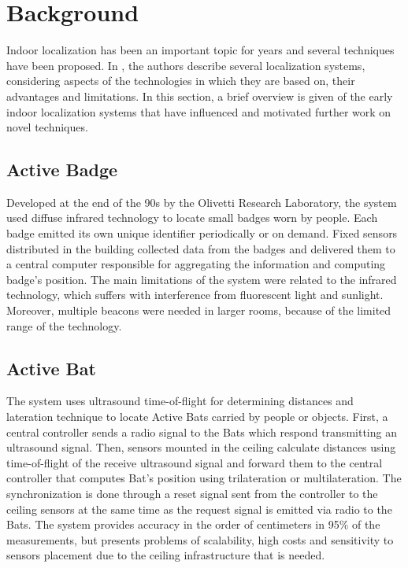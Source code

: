 \section{Background}

Indoor localization has been an important topic for years and several techniques have been proposed. In \cite{locSysUbiComp}, the authors describe several localization systems, considering aspects of the technologies in which they are based on, their advantages and limitations. In this section, a brief overview is given of the early indoor localization systems that have influenced and motivated further work on novel techniques.

\subsection{Active Badge}
Developed at the end of the 90s by the Olivetti Research Laboratory, the system used diffuse infrared technology to locate small badges worn by people. Each badge emitted its own unique identifier periodically or on demand. Fixed sensors distributed in the building collected data from the badges and delivered them to a central computer responsible for aggregating the information and computing badge's position. The main limitations of the system were related to the infrared technology, which suffers with interference from fluorescent light and sunlight. Moreover, multiple beacons were needed in larger rooms, because of the limited range of the technology.

\subsection{Active Bat}
The system uses ultrasound time-of-flight for determining distances and lateration technique to locate Active Bats carried by people or objects. First, a central controller sends a radio signal to the Bats which respond transmitting an ultrasound signal. Then, sensors mounted in the ceiling calculate distances using time-of-flight of the receive ultrasound signal and forward them to the central controller that computes Bat's position using trilateration or multilateration. The synchronization is done through a reset signal sent from the controller to the ceiling sensors at the same time as the request signal is emitted via radio to the Bats. The system provides accuracy in the order of centimeters in 95\% of the measurements, but presents problems of scalability, high costs and sensitivity to sensors placement due to the ceiling infrastructure that is needed.

